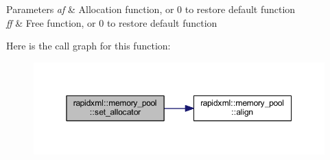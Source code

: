\begin{DoxyParams}{Parameters}
{\em af} & Allocation function, or 0 to restore default function \\
\hline
{\em ff} & Free function, or 0 to restore default function \\
\hline
\end{DoxyParams}


Here is the call graph for this function\+:\nopagebreak
\begin{figure}[H]
\begin{center}
\leavevmode
\includegraphics[width=350pt]{classrapidxml_1_1memory__pool_a84d3d8d2cdfc00501e1dcf26d889ae03_cgraph}
\end{center}
\end{figure}




